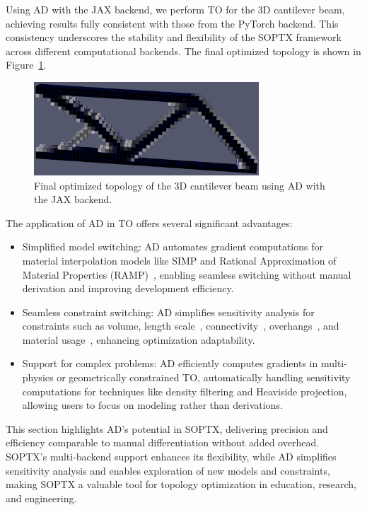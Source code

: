 \documentclass[mathpazo]{cicp}
\begin{document}
Using AD with the JAX backend, we perform TO for the 3D cantilever beam, achieving results fully consistent with those from the PyTorch backend. This consistency underscores the stability and flexibility of the SOPTX framework across different computational backends. The final optimized topology is shown in Figure~\ref{fig:canti3d_ad_jax}.
\begin{figure}[htbp] 
	\centering 
	\includegraphics[width=0.75\textwidth]{figures/cantilever_3d_auto_jax.png} \caption{Final optimized topology of the 3D cantilever beam using AD with the JAX backend.} \label{fig:canti3d_ad_jax} 
\end{figure}

The application of AD in TO offers several significant advantages:
\begin{itemize} 
	\item Simplified model switching: AD automates gradient computations for material interpolation models like SIMP and Rational Approximation of Material Properties (RAMP)~\cite{stolpe2001alternative}, enabling seamless switching without manual derivation and improving development efficiency.
	\item Seamless constraint switching: AD simplifies sensitivity analysis for constraints such as volume, length scale~\cite{guest2009imposing}, connectivity~\cite{li2016structural}, overhangs~\cite{qian2017undercut}, and material usage~\cite{sanders2018multi}, enhancing optimization adaptability.
	\item Support for complex problems: AD efficiently computes gradients in multi-physics or geometrically constrained TO, automatically handling sensitivity computations for techniques like density filtering and Heaviside projection, allowing users to focus on modeling rather than derivations.
\end{itemize}

This section highlights AD’s potential in SOPTX, delivering precision and efficiency comparable to manual differentiation without added overhead. SOPTX’s multi-backend support enhances its flexibility, while AD simplifies sensitivity analysis and enables exploration of new models and constraints, making SOPTX a valuable tool for topology optimization in education, research, and engineering.
\end{document}
